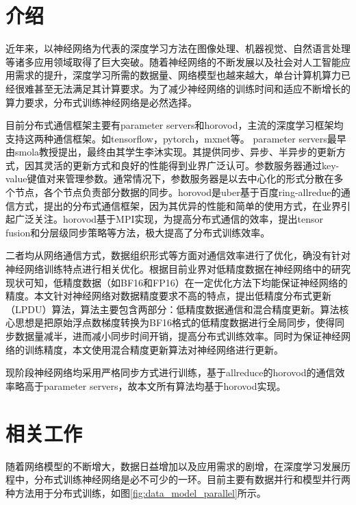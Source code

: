 \chapter{介绍}
近年来，以神经网络为代表的深度学习方法在图像处理、机器视觉、自然语言处理等诸多应用领域取得了巨大突破。随着神经网络的不断发展以及社会对人工智能应用需求的提升，深度学习所需的数据量、网络模型也越来越大，单台计算机算力已经很难甚至无法满足其计算要求。为了减少神经网络的训练时间和适应不断增长的算力要求，分布式训练神经网络是必然选择。

目前分布式通信框架主要有parameter servers和horovod，主流的深度学习框架均支持这两种通信框架。如tensorflow，pytorch，mxnet等。
parameter servers最早由smola教授提出，最终由其学生李沐实现。其提供同步、异步、半异步的更新方式，因其灵活的更新方式和良好的性能得到业界广泛认可。参数服务器通过key-value键值对来管理参数。通常情况下，参数服务器是以去中心化的形式分散在多个节点，各个节点负责部分数据的同步。horovod是uber基于百度ring-allredue的通信方式，提出的分布式通信框架，因为其优异的性能和简单的使用方式，在业界引起广泛关注。horovod基于MPI实现，为提高分布式通信的效率，提出tensor fusion和分层级同步策略等方法，极大提高了分布式训练效率。 

二者均从网络通信方式，数据组织形式等方面对通信效率进行了优化，确没有针对神经网络训练特点进行相关优化。根据目前业界对低精度数据在神经网络中的研究现状可知，低精度数据（如BF16和FP16）在一定优化方法下均能保证神经网络的精度。本文针对神经网络对数据精度要求不高的特点，提出低精度分布式更新（LPDU）算法，算法主要包含两部分：低精度数据通信和混合精度更新。算法核心思想是把原始浮点数梯度转换为BF16格式的低精度数据进行全局同步，使得同步数据量减半，进而减小同步时间开销，提高分布式训练效率。同时为保证神经网络的训练精度，本文使用混合精度更新算法对神经网络进行更新。

现阶段神经网络均采用严格同步方式进行训练，基于allreduce的horovod的通信效率略高于parameter servers，故本文所有算法均基于horovod实现。

\chapter{相关工作}
随着网络模型的不断增大，数据日益增加以及应用需求的剧增，在深度学习发展历程中，分布式训练神经网络是必不可少的一环。目前主要有数据并行和模型并行两种方法用于分布式训练，如图\ref{fig:data_model_parallel}所示。


